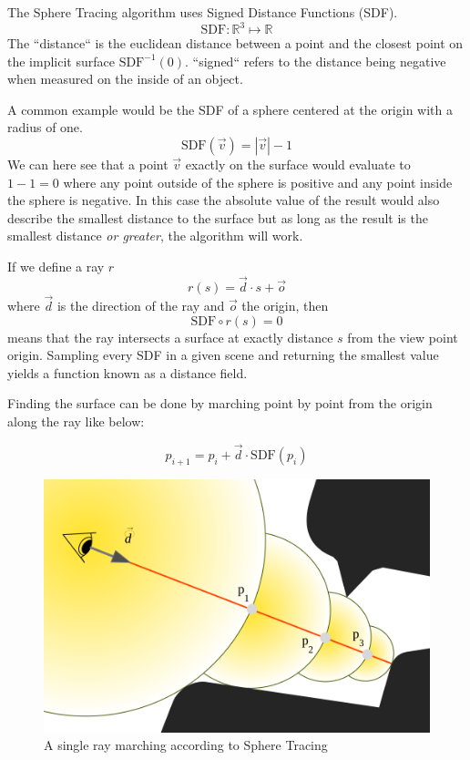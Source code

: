 		The Sphere Tracing algorithm uses Signed Distance Functions (SDF).
		$$\text{SDF}:\mathbb{R}^{3}\mapsto\mathbb{R}$$ The ``distance`` is the euclidean distance between a point and the closest point on the implicit surface
		$\text{SDF}^{-1}(0)$. ``signed`` refers to the distance being
		negative when measured on the inside of an object. 

		A common example would be the SDF of a sphere centered at the origin with a
		radius of one. $$\text{SDF}(\vec{v}) = |\vec{v}| - 1$$ We can here see that
		a point $\vec{v}$ exactly on the surface would evaluate to $1 - 1 = 0$
		where any point outside of the sphere is positive and any point inside the
		sphere is negative. In this case the absolute value of the result would also
		describe the smallest distance to the surface but as long as the result is
		the smallest distance \emph{or greater}, the algorithm will work.

		If we define a ray $r$ $$r(s) = \vec{d} \cdot s + \vec{o}$$
		where $\vec{d}$ is the direction of the ray and $\vec{o}$ the origin, then
		$$\text{SDF}\circ r(s) = 0$$ means that the ray intersects a surface at
		exactly distance $s$ from the view point origin. Sampling every SDF in a
		given scene and returning the smallest value yields a function known as a
		distance field.

		\bigskip \noindent Finding the surface can be done by marching point by
		point from the origin along the ray like below: 
		
		$$p_{i+1} = p_i + \vec{d}\cdot \text{SDF}(p_i)$$ 
		
		\vspace{40pt}
		\begin{figure}
			\begin{flushright}
				\includegraphics[width=0.9\linewidth]{figure/SDF2} 
			\end{flushright}
			\caption{A single ray marching according to Sphere Tracing}
			\vspace{40pt}
		\end{figure}

